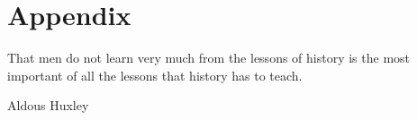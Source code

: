 
\section{Appendix}
\label{ch:appendix}

\epigraph{That men do not learn very much from the lessons of history is the most important of all the lessons that history has to teach.}{Aldous Huxley}

\cleardoublepage